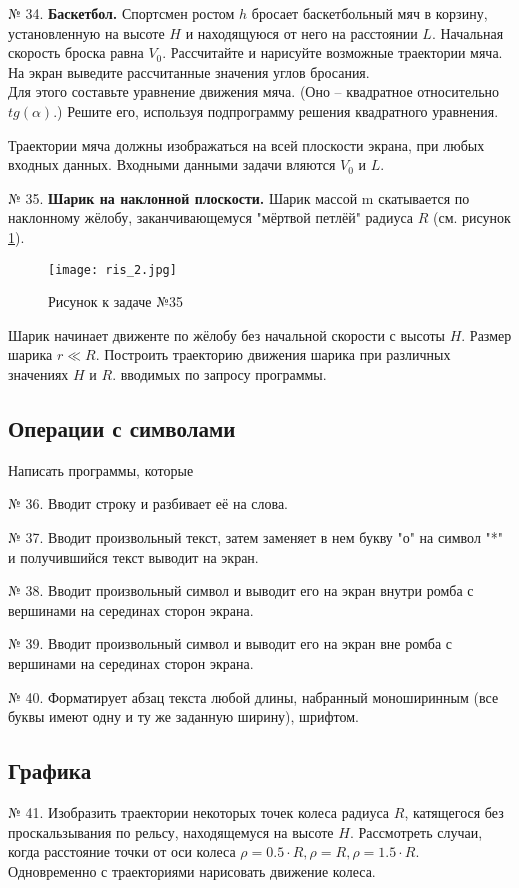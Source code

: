 № 34. {\bf Баскетбол.}
Спортсмен ростом $h$ бросает баскетбольный мяч в корзину, установленную на высоте $H$ и находящуюся от него на расстоянии $L$. Начальная скорость броска равна $V_0$. Рассчитайте и нарисуйте возможные траектории мяча. На экран выведите рассчитанные значения углов бросания.\\
Для этого составьте уравнение движения мяча. (Оно -- квадратное относительно $tg(\alpha)$.)  Решите его, используя подпрограмму решения квадратного уравнения.

Траектории мяча должны изображаться на всей плоскости экрана, при любых входных данных. Входными данными задачи  вляются  $V_0$ и $L$.

№ 35. {\bf Шарик на наклонной плоскости.}
Шарик массой m скатывается по наклонному жёлобу, заканчивающемуся "мёртвой петлёй" радиуса $R$ (см. рисунок \ref{ris2}). 
\begin{figure}[!hb]
\centerline{
\texttt{[image: ris\_2.jpg]}}
\caption{Рисунок к задаче №35}
\label{ris2}
\end{figure}
Шарик начинает движенте по жёлобу без начальной скорости с высоты $H$. Размер шарика $r \ll R$. Построить траекторию движения шарика при различных значениях $H$ и $R$. вводимых по запросу программы.

\subsection{Операции с символами}

Написать программы, которые

№ 36. Вводит строку и разбивает её на слова.

№ 37. Вводит произвольный текст, затем заменяет в нем букву "о" на   символ "*" и получившийся текст выводит на экран.

№ 38. Вводит произвольный символ и выводит его на экран внутри ромба с вершинами на серединах сторон экрана.

№ 39. Вводит произвольный символ и выводит его на экран вне ромба с вершинами на серединах сторон экрана.

№ 40. Форматирует абзац текста любой длины, набранный моноширинным (все буквы имеют одну и ту же заданную ширину), шрифтом.

\subsection{Графика}

№ 41. Изобразить траектории некоторых точек колеса радиуса $R$, катящегося без проскальзывания по рельсу, находящемуся на высоте $H$. Рассмотреть случаи, когда расстояние точки от оси колеса $\rho = 0.5\cdot R, \rho = R, \rho = 1.5\cdot R$. Одновременно с траекториями нарисовать движение колеса.


